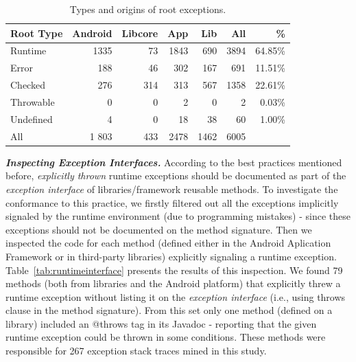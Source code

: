 
\begin{table}
\centering
\begin{tabular}{lrrrrrr}
    \hline
    \bfseries{Root Type} & \bfseries{Android} & \bfseries{Libcore} & \bfseries{App} & \bfseries{Lib}  & \bfseries{All} & \bfseries{\%} \\
    \hline

Runtime	&	1335	&	73	&	1843	&	690  &	3894 & 64.85\% \\  %
Error	       &	 188              &	 46	&	302             &	167	           &	691 & 11.51\%	\\
Checked	&	276           &	314	&	313          &	567	           &	1358 & 22.61\%	\\
Throwable	&	0	       &	0	&	2            &	0         &	2 & 0.03\%	\\
Undefined	&	4	&	0	&	18		&	38	   &	60	& 1.00\% \\
 \hline
All		& 1  803	&	433	&	2478	&	1462	&	6005 	\\
    \hline
  \end{tabular}
\caption{Types and origins of root exceptions.}
  \label{tab:typeroottab}
\end{table}


\emph{\textbf{Inspecting Exception Interfaces.}}  According to the best practices mentioned before, 
 \emph{explicitly thrown} runtime exceptions 
should be documented as part of the \emph{exception interface} of libraries/framework reusable
methods. To investigate the conformance to this practice, we firstly filtered out all the exceptions implicitly
 signaled by  the runtime environment (due to programming mistakes) - since these exceptions 
should not be documented on the method signature.  Then we inspected
the code for each method 
(defined either in the Android  Aplication Framework or in third-party libraries) 
explicitly signaling a runtime exception. 
Table~\ref{tab:runtimeinterface} presents the results of this inspection. 
We found 79 methods (both from libraries and the Android platform) that  explicitly threw a runtime exception 
without listing it on the \emph{exception interface} (i.e., using 
throws clause in the method signature). From this set only one method (defined on a library)
included an @throws tag in its Javadoc - reporting that the given runtime exception
could be thrown in some conditions. These methods were responsible for 
267 exception stack traces mined in this study.

